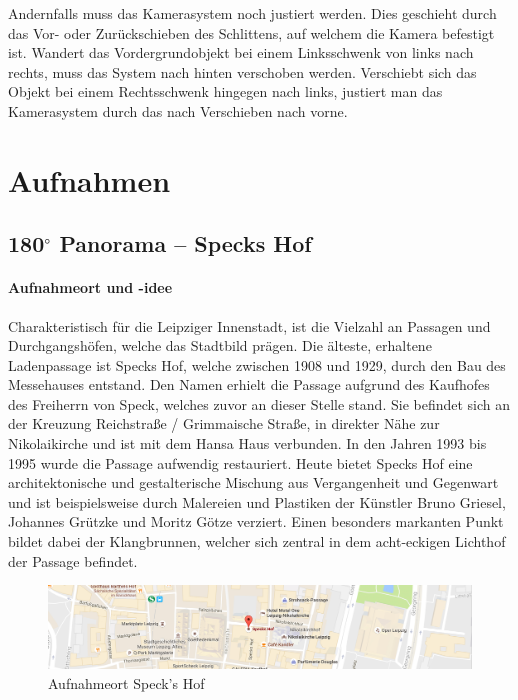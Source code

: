\documentclass[liststotoc,bibtotoc,fontsize=14pt,]{scrreprt}
\begin{document}
	\bigskip
	Andernfalls muss das Kamerasystem noch justiert werden. Dies geschieht durch das Vor- oder Zurückschieben des Schlittens, auf welchem die Kamera befestigt ist. Wandert das Vordergrundobjekt bei einem Linksschwenk von links nach rechts, muss das System nach hinten verschoben werden. Verschiebt sich das Objekt bei einem Rechtsschwenk hingegen nach links, justiert man das Kamerasystem durch das nach Verschieben nach vorne.
	
	\chapter{Aufnahmen}
	\label{ch:aufnahmen}
	
	\section{180$^\circ$ Panorama -- Speck\grq s Hof}
	\label{sec:specks}

	\subsubsection{Aufnahmeort und -idee}
	Charakteristisch für die Leipziger Innenstadt, ist die Vielzahl an Passagen und Durchgangshöfen, welche das Stadtbild prägen. Die älteste, erhaltene Ladenpassage ist Speck\grq s Hof, welche zwischen 1908 und 1929, durch den Bau des Messehauses entstand. Den Namen erhielt die Passage aufgrund des Kaufhofes des Freiherrn von Speck, welches zuvor an dieser Stelle stand. Sie befindet sich an der Kreuzung Reichstraße / Grimmaische Straße, in direkter Nähe zur Nikolaikirche und ist mit dem Hansa Haus verbunden. In den Jahren 1993 bis 1995 wurde die Passage aufwendig restauriert. Heute bietet Speck\grq s Hof eine architektonische und gestalterische Mischung aus Vergangenheit und Gegenwart und ist beispielsweise durch Malereien und Plastiken der Künstler Bruno Griesel, Johannes Grützke und Moritz Götze verziert. Einen besonders markanten Punkt bildet dabei der Klangbrunnen, welcher sich zentral in dem acht-eckigen Lichthof der Passage befindet.
	
			\begin{figure}[H]
				\includegraphics[width=\linewidth]{img/places/sh_map.jpg}
				\caption{Aufnahmeort Speck's Hof}
				\label{img:sh_map}
			\end{figure}
			
\end{document}
